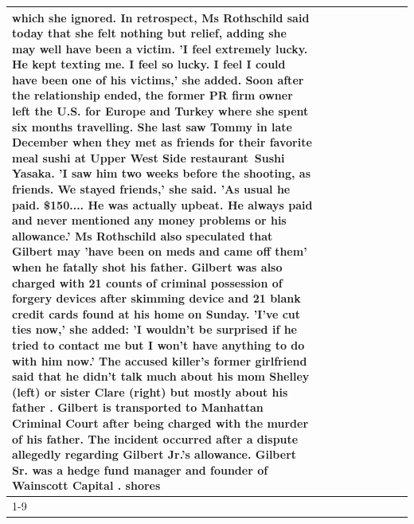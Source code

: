 \begin{table}[H]
\begin{tabular}{lllrlllll}
which she ignored. In retrospect, Ms Rothschild said today that she felt nothing but relief, adding she may well have been a victim. 'I feel extremely lucky. He kept texting me. I feel so lucky. I feel I could have been one of his victims,' she added. Soon after the relationship ended, the former PR firm owner left the U.S. for Europe and Turkey where she spent six months  travelling. She last saw Tommy in late December when they met as friends for their favorite meal sushi at Upper West Side restaurant Sushi Yasaka. 'I saw him two weeks before the shooting, as friends. We stayed friends,' she said. 'As usual he paid. \$150.... He was actually upbeat. He always paid and never mentioned any money problems or his allowance.' Ms Rothschild also speculated that Gilbert may 'have been on meds and came off them' when he fatally shot his father. Gilbert was also charged with 21 counts of criminal possession of forgery devices after skimming device and 21 blank credit cards found at his home on Sunday. 'I've cut ties now,' she added: 'I wouldn’t be surprised if he tried to contact me but I won’t have anything to do with him now.' The accused killer's former girlfriend said that he didn't talk much about his mom Shelley (left) or sister Clare (right) but mostly about his father . Gilbert is transported to Manhattan Criminal Court  after being charged with the murder of his father. The incident occurred after a dispute allegedly regarding Gilbert Jr.'s allowance. Gilbert Sr. was a hedge fund manager and founder of Wainscott Capital . shores \\
\cline{1-9}

\end{tabular}
\end{table}
